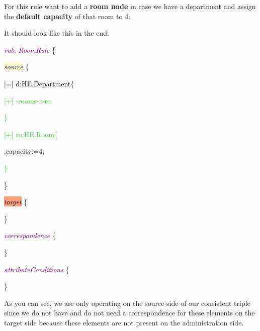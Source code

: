 {For this rule want to add a \textbf{room node} in case we have a department and assign the \textbf{default capacity} of that room to 4.

It should look like this in the end:\newline

{
	
	\hspace{0.5cm}\textcolor{Purple}{\textit{rule RoomRule}} \{
	
	\hspace{0.5cm}\colorbox{LightYellow}{\textit{source}} \{ 
	
	\hspace{1cm}\textcolor{black}{[=] d:HE.Department\{}
	
	\hspace{1.5cm}\textcolor{LimeGreen}{[+] -rooms->ro}
	
	\hspace{1cm}\textcolor{LimeGreen}{\}}
	
	\hspace{1cm}\textcolor{LimeGreen}{[+] ro:HE.Room\{}
	
	\hspace{1.5cm} .capacity:=4;
	
	\hspace{1cm}\textcolor{LimeGreen}{\}}
	
	\hspace{0.5cm}\}
	
	\hspace{0.5cm}\textcolor{black}{\colorbox{LightSalmon}{\textit{target}}} \{
	
	\hspace{0.5cm}\}
	
	\hspace{0.5cm}\textcolor{Purple}{\textit{correspondence}} \{
	
	\hspace{0.5cm}\}
	
	\hspace{0.5cm}\textcolor{Purple}{\textit{attributeConditions}} \{
	
	\hspace{0.5cm}\}
	\par
}


As you can see, we are only operating on the source side of our consistent triple since we do not have and do not need a correspondence for these elements on the target side because these elements are not present on the administration side. \newline

}
